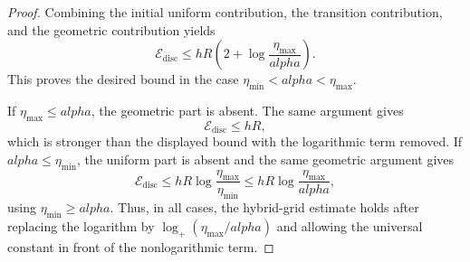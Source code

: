 \documentclass[10pt,a4paper]{amsart}
\def\alpha{alpha}%
\begin{document}
\begin{proof}
Combining the initial uniform contribution, the transition contribution, and the geometric contribution yields
\[
    \mathcal E_{\mathrm{disc}}
    \le
    hR
    \left(
    2+\log\frac{\eta_{\max}}{\alpha}
    \right).
\]
This proves the desired bound in the case $\eta_{\min}<\alpha<\eta_{\max}$.

If $\eta_{\max}\le\alpha$, the geometric part is absent. The same argument gives
\[
    \mathcal E_{\mathrm{disc}}\le hR,
\]
which is stronger than the displayed bound with the logarithmic term removed. If $\alpha\le\eta_{\min}$, the uniform part is absent and the same geometric argument gives
\[
    \mathcal E_{\mathrm{disc}}
    \le
    hR
    \log\frac{\eta_{\max}}{\eta_{\min}}
    \le
    hR
    \log\frac{\eta_{\max}}{\alpha},
\]
using $\eta_{\min}\ge\alpha$. Thus, in all cases, the hybrid-grid estimate holds after replacing the logarithm by $\log_+(\eta_{\max}/\alpha)$ and allowing the universal constant in front of the nonlogarithmic term.
\end{proof}
\end{document}
